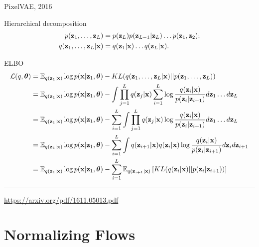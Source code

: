 \documentclass{beamer}
\begin{document}
\begin{frame}{PixelVAE, 2016}
	\begin{block}{Hierarchical decomposition}
		\vspace{-1cm}
		\begin{align*}
			p(\mathbf{z}_1, \dots, \mathbf{z}_L) &= p(\mathbf{z}_L) p(\mathbf{z}_{L-1} | \mathbf{z}_L) \dots p(\mathbf{z}_1, \mathbf{z}_2); \\
			q(\mathbf{z}_1, \dots, \mathbf{z}_L | \mathbf{x}) &= q(\mathbf{z}_1 | \mathbf{x}) \dots q(\mathbf{z}_L | \mathbf{x}).
		\end{align*}
	\end{block}
	\vspace{-0.5cm}
	\begin{block}{ELBO}
		\vspace{-0.5cm}
		{\footnotesize
			\begin{align*}
				\mathcal{L}(q, \boldsymbol{\theta}) &= \mathbb{E}_{q(\mathbf{z}_1 | \mathbf{x})} \log p(\mathbf{x} | \mathbf{z}_1, \boldsymbol{\theta}) - KL(q(\mathbf{z}_1, \dots, \mathbf{z}_L | \mathbf{x}) || p(\mathbf{z}_1, \dots, \mathbf{z}_L)) \\
				&= \mathbb{E}_{q(\mathbf{z}_1 | \mathbf{x})} \log p(\mathbf{x} | \mathbf{z}_1, \boldsymbol{\theta}) - \int \prod_{j=1}^L q(\mathbf{z}_j | \mathbf{x}) \sum_{i=1}^L \log \frac{q(\mathbf{z}_i | \mathbf{x})}{p(\mathbf{z}_i | \mathbf{z}_{i + 1})} d \mathbf{z}_1 \dots d \mathbf{z}_L \\
				&= \mathbb{E}_{q(\mathbf{z}_1 | \mathbf{x})} \log p(\mathbf{x} | \mathbf{z}_1, \boldsymbol{\theta}) - \sum_{i=1}^L \int \prod_{j=1}^L q(\mathbf{z}_j | \mathbf{x}) \log \frac{q(\mathbf{z}_i | \mathbf{x})}{p(\mathbf{z}_i | \mathbf{z}_{i + 1})} d \mathbf{z}_1 \dots d \mathbf{z}_L \\
				&= \mathbb{E}_{q(\mathbf{z}_1 | \mathbf{x})} \log p(\mathbf{x} | \mathbf{z}_1, \boldsymbol{\theta}) - \sum_{i=1}^L \int q(\mathbf{z}_{i+1} | \mathbf{x}) q(\mathbf{z}_i | \mathbf{x}) \log \frac{q(\mathbf{z}_i | \mathbf{x})}{p(\mathbf{z}_i | \mathbf{z}_{i + 1})} d \mathbf{z}_i d \mathbf{z}_{i+1} \\
				&= \mathbb{E}_{q(\mathbf{z}_1 | \mathbf{x})} \log p(\mathbf{x} | \mathbf{z}_1, \boldsymbol{\theta}) - \sum_{i=1}^L \mathbb{E}_{q(\mathbf{z}_{i+1} | \mathbf{x})} \left[ KL (q(\mathbf{z}_i | \mathbf{x}) || p(\mathbf{z}_i | \mathbf{z}_{i + 1}))\right]
			\end{align*}
		}
	\end{block}
	\vfill
	\hrule\medskip
	{\scriptsize \href{https://arxiv.org/pdf/1611.05013.pdf}{https://arxiv.org/pdf/1611.05013.pdf}}
\end{frame}
\section{Normalizing Flows}
\end{document}
